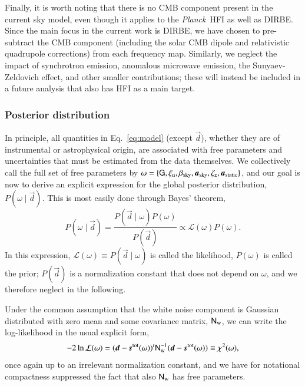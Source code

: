 \documentclass{aa}
\def\Planck{\textit{Planck}}
\newcommand{\dv}[0]{\vec{d}}
\newcommand{\G}[0]{\tens{G}}
\newcommand{\s}[0]{\vec{s}}
\renewcommand{\a}[0]{\vec{a}}
\newcommand{\N}[0]{\tens{N}}
\begin{document}
Finally, it is worth noting that there is no CMB component present in
the current sky model, even though it applies to the \Planck\ HFI as
well as DIRBE. Since the main focus in the current work is DIRBE, we
have chosen to pre-subtract the CMB component (including the solar CMB
dipole and relativistic quadrupole corrections) from each frequency
map. Similarly, we neglect the impact of synchrotron emission,
anomalous microwave emission, the Sunyaev-Zeldovich effect, and other
smaller contributions; these will instead be included in a future
analysis that also has HFI as a main target.

\subsubsection{Posterior distribution}

In principle, all quantities in Eq.~\ref{eq:model} (except $\dv$),
whether they are of instrumental or astrophysical origin, are
associated with free parameters and uncertainties that must be
estimated from the data themselves. We collectively call the full set
of free parameters by $\omega =
\{\G,\xi_{\mathrm{n}},
\beta_{\mathrm{sky}},\a_{\mathrm{sky}},\zeta_{\mathrm{z}},\a_{\mathrm{static}}\}$,
and our goal is now to derive an explicit expression for the global
posterior distribution, $P(\omega\mid\dv)$. This is most easily done
through Bayes' theorem,
\begin{equation}
P(\omega\mid\dv) = \frac{P(\dv\mid\omega) P(\omega)}{P(\dv)} \propto
\mathcal{L}(\omega) P(\omega).
\end{equation}
In this expression, $\mathcal{L}(\omega) \equiv  P(\dv\mid\omega)$ is
called the likelihood, $P(\omega)$ is called the prior; $P(\dv)$ is a
normalization constant that does not depend on $\omega$, and we
therefore neglect in the following.

Under the common assumption that the white noise component is Gaussian
distributed with zero mean and some covariance matrix,
$\N_{\mathrm{w}}$, we can write the log-likelihood in the usual
explicit form,
\begin{equation}
-2\ln\mathcal{L}(\omega) = (\dv-\s^{\mathrm{tot}}(\omega))^t
  \N_{\mathrm{w}}^{-1}(\dv-\s^{\mathrm{tot}}(\omega)) \equiv \chi^2(\omega),
\end{equation}
once again up to an irrelevant normalization constant, and we have for
notational compactness suppressed the fact that also $\N_{\mathrm{w}}$ has free
parameters. 
\end{document}

